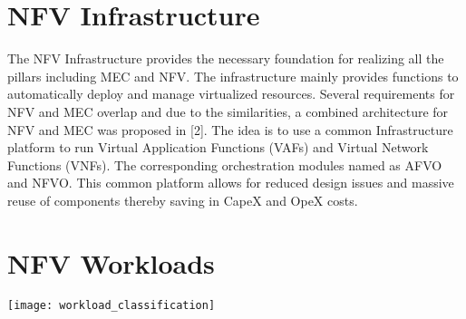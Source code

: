 \section{NFV Infrastructure}

\begin{flushleft}	
The NFV Infrastructure provides the necessary foundation for realizing all the pillars including MEC and NFV. The infrastructure mainly provides functions to automatically deploy and manage virtualized resources. Several requirements for NFV and MEC overlap and due to the similarities, a combined architecture for NFV and MEC was proposed in [2]. The idea is to use a common Infrastructure platform to run Virtual Application Functions (VAFs) and Virtual Network Functions (VNFs). The corresponding orchestration modules named as AFVO and NFVO. This common platform allows for reduced design issues and massive reuse of components thereby saving in CapeX and OpeX costs.
\end{flushleft}

\section{NFV Workloads}

\texttt{[image: workload\_classification]}
